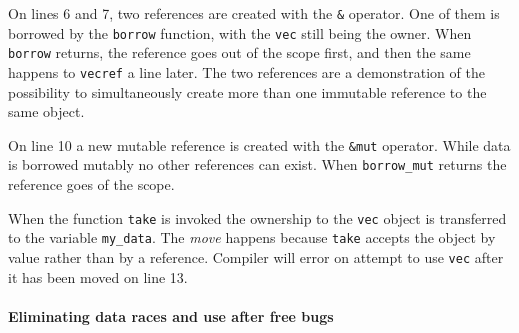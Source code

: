 On lines 6 and 7, two references are created with the \texttt{&} operator. One of them is borrowed by the \texttt{borrow} function, with the \texttt{vec} still being the owner. When \texttt{borrow} returns, the reference goes out of the scope first, and then the same happens to \texttt{vecref} a line later. The two references are a demonstration of the possibility to simultaneously create more than one immutable reference to the same object.

On line 10 a new mutable reference is created with the \texttt{&mut} operator. While data is borrowed mutably no other references can exist. When \texttt{borrow_mut} returns the reference goes of the scope.

When the function \texttt{take} is invoked the ownership to the \texttt{vec} object is transferred to the variable \texttt{my_data}. The \emph{move} happens because \texttt{take} accepts the object by value rather than by a reference. Compiler will error on attempt to use \texttt{vec} after it has been moved on line 13.

\paragraph{Eliminating data races and use after free bugs}


